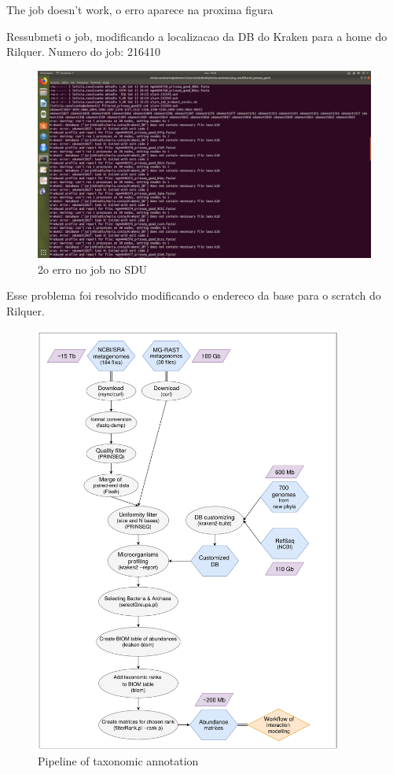 \documentclass[12pt, a4paper]{report}
\begin{document}
The job doesn't work, o erro aparece na proxima figura

Ressubmeti o job, modificando a localizacao da DB do Kraken para a home do Rilquer. Numero do job: 216410
 \begin{figure}
  \centering 
  \includegraphics[width=1.0\textwidth]{figures/Captura2.png}
  \caption{2o erro no job no SDU}
 \end{figure} 

Esse problema foi resolvido modificando o endereco da base para o scratch do Rilquer.

\begin{figure}
  \centering 
  \includegraphics[width=0.9\textwidth]{figures/workflow-aquifers-reviewed_03-09-18.pdf}
  \caption{Pipeline of taxonomic annotation} 
  \end{figure}
\end{document}

